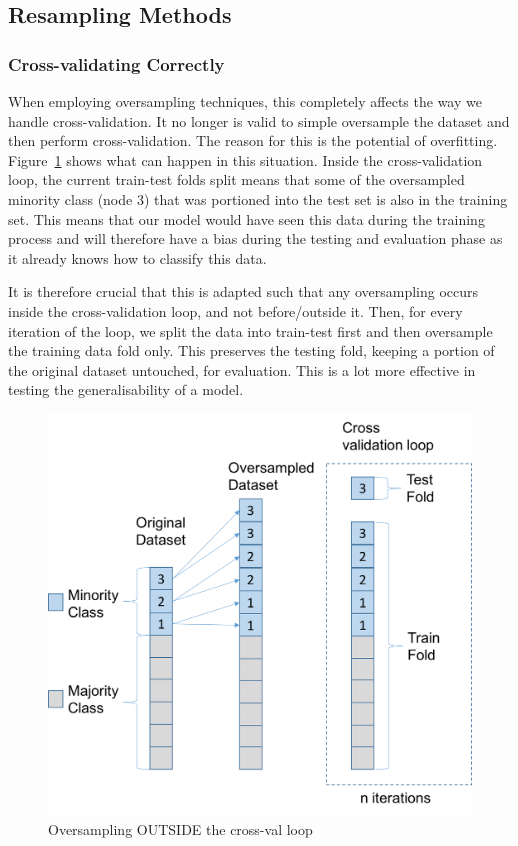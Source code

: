 \documentclass[12pt,a4paper,twoside]{report}
\begin{document}
\subsection{Resampling Methods}

\subsubsection{Cross-validating Correctly}
When employing oversampling techniques, this completely affects the way we handle cross-validation. It no longer is valid to simple oversample the dataset and then perform cross-validation. The reason for this is the potential of overfitting. Figure~\ref{fig:oversample-before} shows what can happen in this situation. Inside the cross-validation loop, the current train-test folds split means that some of the oversampled minority class (node 3) that was portioned into the test set is also in the training set. This means that our model would have seen this data during the training process and will therefore have a bias during the testing and evaluation phase as it already knows how to classify this data. 

It is therefore crucial that this is adapted such that any oversampling occurs inside the cross-validation loop, and not before/outside it. Then, for every iteration of the loop, we split the data into train-test first and then oversample the training data fold only. This preserves the testing fold, keeping a portion of the original dataset untouched, for evaluation. This is a lot more effective in testing the generalisability of a model.

\begin{figure}[H]
\centering
\includegraphics[scale=0.8]{oversample-before}
\caption{Oversampling OUTSIDE the cross-val loop}
\label{fig:oversample-before}
\end{figure}
\end{document}
